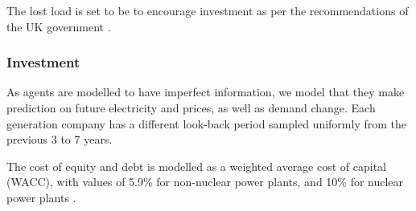The lost load is set to be  to encourage investment as per the recommendations of the UK government \cite{DECC2013}.

\subsubsection{Investment}

As agents are modelled to have imperfect information, we model that they make prediction on future electricity and  prices, as well as demand change. Each generation company has a different look-back period sampled uniformly from the previous 3 to 7 years.


The cost of equity and debt is modelled as a weighted average cost of capital (WACC), with values of 5.9\% for non-nuclear power plants, and 10\% for nuclear power plants \cite{KPMG2017, Paper2012}. 





